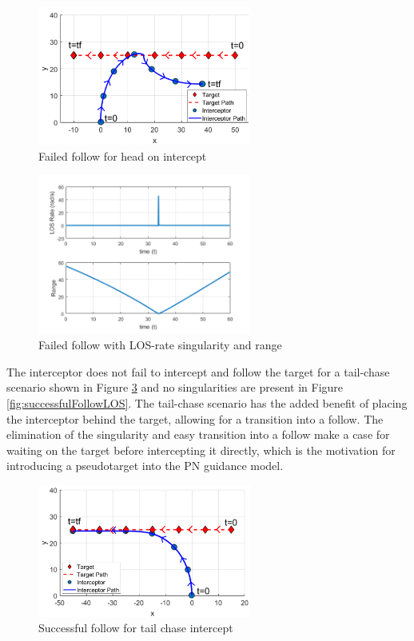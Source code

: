 \documentclass[conference]{IEEEtran}
\begin{document}


\begin{figure}[H]
	\centering
	\includegraphics[width=7cm] {failedHeadOn}
	\caption{Failed follow for head on intercept}
	\label{fig:failedIntercept}
	\hspace*{0mm}
\end{figure}


\begin{figure}[H]
	\centering
	\includegraphics[width=7cm] {x50_range_LOSrate}
	\caption{Failed follow with LOS-rate singularity and range}
	\label{fig:failedInterceptLOS}
	\hspace*{0mm}
\end{figure}


The interceptor does not fail to intercept and follow the target for a tail-chase scenario shown in Figure \ref{fig:successfulFollow} and no singularities are present in Figure \ref{fig:successfulFollowLOS}. The tail-chase scenario has the added benefit of placing the interceptor behind the target, allowing for a transition into a follow. The elimination of the singularity and easy transition into a follow make a case for waiting on the target before intercepting it directly, which is the motivation for introducing a pseudotarget into the PN guidance model.

\begin{figure}[H]
	\centering
	\includegraphics[width=7cm] {tailChaseWithLedgend}
	\caption{Successful follow for tail chase intercept}
	\label{fig:successfulFollow}
	\hspace*{0mm}
\end{figure}
\end{document}
